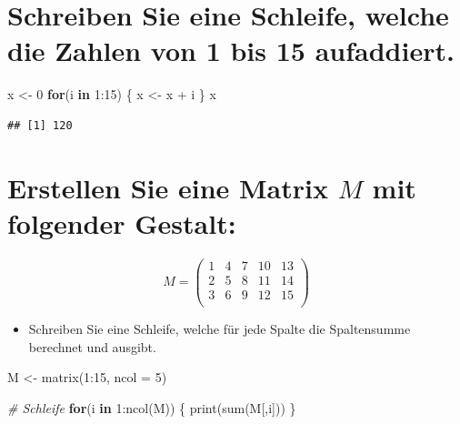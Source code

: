 \documentclass[12pt,a4paper]{article}
\newenvironment{Shaded}{\begin{snugshade}}{\end{snugshade}}
\newcommand{\AttributeTok}[1]{\textcolor[rgb]{0.77,0.63,0.00}{#1}}
\newcommand{\CommentTok}[1]{\textcolor[rgb]{0.56,0.35,0.01}{\textit{#1}}}
\newcommand{\ControlFlowTok}[1]{\textcolor[rgb]{0.13,0.29,0.53}{\textbf{#1}}}
\newcommand{\DecValTok}[1]{\textcolor[rgb]{0.00,0.00,0.81}{#1}}
\newcommand{\FunctionTok}[1]{\textcolor[rgb]{0.00,0.00,0.00}{#1}}
\newcommand{\NormalTok}[1]{#1}
\newcommand{\OtherTok}[1]{\textcolor[rgb]{0.56,0.35,0.01}{#1}}
\newcommand{\SpecialCharTok}[1]{\textcolor[rgb]{0.00,0.00,0.00}{#1}}
\begin{document}
\hypertarget{schreiben-sie-eine-schleife-welche-die-zahlen-von-1-bis-15-aufaddiert.}{%
\section{Schreiben Sie eine Schleife, welche die Zahlen von 1 bis 15
aufaddiert.}\label{schreiben-sie-eine-schleife-welche-die-zahlen-von-1-bis-15-aufaddiert.}}

\begin{Shaded}
\begin{Highlighting}[]
\NormalTok{    x }\OtherTok{\textless{}{-}} \DecValTok{0}
    \ControlFlowTok{for}\NormalTok{(i }\ControlFlowTok{in} \DecValTok{1}\SpecialCharTok{:}\DecValTok{15}\NormalTok{) \{}
\NormalTok{      x }\OtherTok{\textless{}{-}}\NormalTok{ x }\SpecialCharTok{+}\NormalTok{ i}
\NormalTok{    \}}
\NormalTok{    x}
\end{Highlighting}
\end{Shaded}

\begin{verbatim}
## [1] 120
\end{verbatim}

\hypertarget{erstellen-sie-eine-matrix-m-mit-folgender-gestalt}{%
\section{\texorpdfstring{Erstellen Sie eine Matrix \(M\) mit folgender
Gestalt:}{Erstellen Sie eine Matrix M mit folgender Gestalt:}}\label{erstellen-sie-eine-matrix-m-mit-folgender-gestalt}}

\[
M=\begin{pmatrix}
1 & 4 & 7 & 10 & 13\\
2 & 5 & 8 & 11 & 14\\
3 & 6 & 9 & 12 & 15\\
\end{pmatrix}
\]

\begin{itemize}
  \item Schreiben Sie eine Schleife, welche für jede Spalte die Spaltensumme berechnet und ausgibt.
\end{itemize}

\begin{Shaded}
\begin{Highlighting}[]
\NormalTok{    M }\OtherTok{\textless{}{-}} \FunctionTok{matrix}\NormalTok{(}\DecValTok{1}\SpecialCharTok{:}\DecValTok{15}\NormalTok{, }\AttributeTok{ncol =} \DecValTok{5}\NormalTok{)}
    
    \CommentTok{\# Schleife}
    \ControlFlowTok{for}\NormalTok{(i }\ControlFlowTok{in} \DecValTok{1}\SpecialCharTok{:}\FunctionTok{ncol}\NormalTok{(M)) \{}
      \FunctionTok{print}\NormalTok{(}\FunctionTok{sum}\NormalTok{(M[,i]))}
\NormalTok{    \}}
\end{Highlighting}
\end{Shaded}
\end{document}
